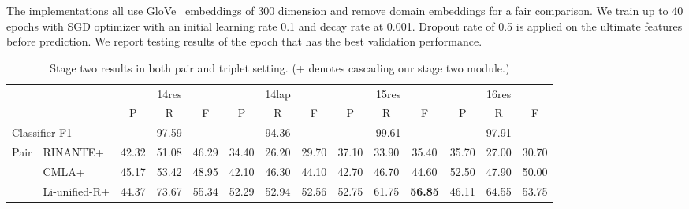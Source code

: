 \documentclass[letterpaper]{article} \usepackage{aaai20}  \usepackage{times}  \usepackage{helvet} \usepackage{courier}  \usepackage[hyphens]{url}  \usepackage{graphicx} \urlstyle{rm} \def\UrlFont{\rm}  \usepackage{graphicx}  \frenchspacing  \setlength{\pdfpagewidth}{8.5in}  \setlength{\pdfpageheight}{11in}
\begin{document}
The implementations all use GloVe~\cite{D14-1162} embeddings of 300 dimension and remove domain embeddings for a fair comparison. We train up to 40 epochs with SGD optimizer with an initial learning rate 0.1 and decay rate at 0.001. Dropout rate of 0.5 is applied on the ultimate features before prediction. We report testing results of the epoch that has the best validation performance. 

\begin{table*}[t]
\caption{Stage two results in both pair and triplet setting. (+ denotes cascading our stage two module.) }
\label{tab:stage2}
\centering
\begin{small}


\begin{tabular}{c|l|ccc|ccc|ccc|ccc}
\hline
\multicolumn{2}{c|}{}                    & \multicolumn{3}{c|}{14res}     & \multicolumn{3}{c|}{14lap}     & \multicolumn{3}{c|}{15res}     & \multicolumn{3}{c}{16res}     \\ \cline{3-14} 
\multicolumn{2}{c|}{}                    & P     & R     & F              & P     & R     & F              & P     & R     & F              & P     & R     & F              \\ \hline
\multicolumn{2}{l|}{Classifier F1}       & \multicolumn{3}{c|}{97.59}     & \multicolumn{3}{c|}{94.36}     & \multicolumn{3}{c|}{99.61}     & \multicolumn{3}{c}{97.91}     \\ \hline
\multirow{4}{*}{Pair}    & RINANTE+      & 42.32 & 51.08 & 46.29          & 34.40 & 26.20 & 29.70          & 37.10 & 33.90 & 35.40          & 35.70 & 27.00 & 30.70          \\ \cline{2-2}
                         & CMLA+         & 45.17 & 53.42 & 48.95          & 42.10 & 46.30 & 44.10          & 42.70 & 46.70 & 44.60          & 52.50 & 47.90 & 50.00          \\ \cline{2-2}


                         & Li-unified-R+ & 44.37 & 73.67 & 55.34 & 52.29 & 52.94 & 52.56          & 52.75 & 61.75 & \textbf{56.85} & 46.11 & 64.55 & 53.75          \\ \cline{2-2}



\end{tabular}
\end{small}
\end{table*}
\end{document}

